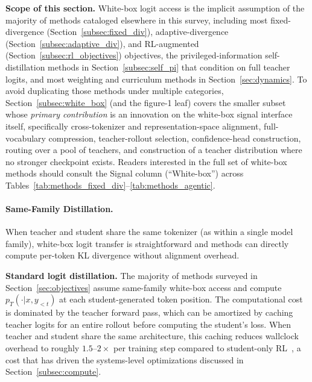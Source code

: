 \documentclass{article} %
\newcommand{\pteacher}{p_T}
\begin{document}
\textbf{Scope of this section.} White-box logit access is the implicit assumption of the majority of methods cataloged elsewhere in this survey, including most fixed-divergence (Section~\ref{subsec:fixed_div}), adaptive-divergence (Section~\ref{subsec:adaptive_div}), and RL-augmented (Section~\ref{subsec:rl_objectives}) objectives, the privileged-information self-distillation methods in Section~\ref{subsec:self_pi} that condition on full teacher logits, and most weighting and curriculum methods in Section~\ref{sec:dynamics}. To avoid duplicating those methods under multiple categories, Section~\ref{subsec:white_box} (and the figure-1 leaf) covers the smaller subset whose \emph{primary contribution} is an innovation on the white-box signal interface itself, specifically cross-tokenizer and representation-space alignment, full-vocabulary compression, teacher-rollout selection, confidence-head construction, routing over a pool of teachers, and construction of a teacher distribution where no stronger checkpoint exists. Readers interested in the full set of white-box methods should consult the Signal column (``White-box'') across Tables~\ref{tab:methods_fixed_div}--\ref{tab:methods_agentic}.

\paragraph{Same-Family Distillation.}
\label{subsubsec:same_family}

When teacher and student share the same tokenizer (as within a single model family), white-box logit transfer is straightforward and methods can directly compute per-token KL divergence without alignment overhead.

\textbf{Standard logit distillation.} The majority of methods surveyed in Section~\ref{sec:objectives} assume same-family white-box access and compute $\pteacher(\cdot|x, y_{<t})$ at each student-generated token position. The computational cost is dominated by the teacher forward pass, which can be amortized by caching teacher logits for an entire rollout before computing the student's loss. When teacher and student share the same architecture, this caching reduces wallclock overhead to roughly $1.5$--$2\times$ per training step compared to student-only RL~\citep{2306.13649}, a cost that has driven the systems-level optimizations discussed in Section~\ref{subsec:compute}.
\end{document}
